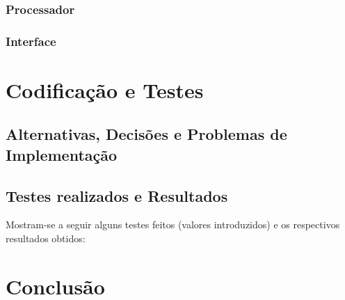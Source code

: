 \documentclass{report}
\begin{document}
\subsection{Processador}
\subsection{Interface}

\chapter{Codificação e Testes}
\section{Alternativas, Decisões e Problemas de Implementação}
\section{Testes realizados e Resultados}
Mostram-se a seguir alguns testes feitos (valores introduzidos) e
os respectivos resultados obtidos:

\chapter{Conclusão} \label{concl}



\end{document}
